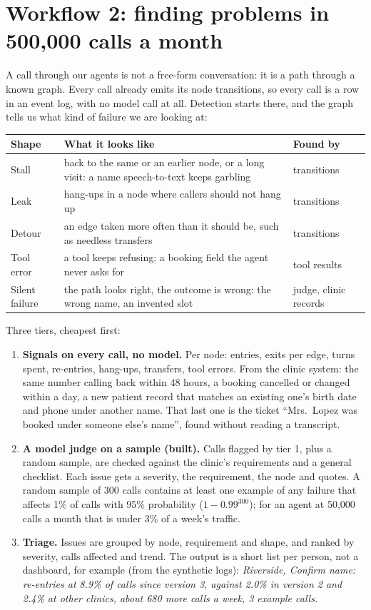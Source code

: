 \documentclass[11pt,a4paper]{article}
\begin{document}
\section{Workflow 2: finding problems in 500,000 calls a month}

A call through our agents is not a free-form conversation: it is a path through a known graph. Every call already emits its node transitions, so every call is a row in an event log, with no model call at all. Detection starts there, and the graph tells us what kind of failure we are looking at:

\begin{center}\small
\begin{tabularx}{\linewidth}{@{}l X l@{}}
\toprule
\textbf{Shape} & \textbf{What it looks like} & \textbf{Found by} \\
\midrule
Stall & back to the same or an earlier node, or a long visit: a name speech-to-text keeps garbling & transitions \\
Leak & hang-ups in a node where callers should not hang up & transitions \\
Detour & an edge taken more often than it should be, such as needless transfers & transitions \\
Tool error & a tool keeps refusing: a booking field the agent never asks for & tool results \\
Silent failure & the path looks right, the outcome is wrong: the wrong name, an invented slot & judge, clinic records \\
\bottomrule
\end{tabularx}
\end{center}

Three tiers, cheapest first:
\begin{enumerate}[leftmargin=1.4em]
  \item \textbf{Signals on every call, no model.} Per node: entries, exits per edge, turns spent, re-entries, hang-ups, transfers, tool errors. From the clinic system: the same number calling back within 48 hours, a booking cancelled or changed within a day, a new patient record that matches an existing one's birth date and phone under another name. That last one is the ticket ``Mrs.\ Lopez was booked under someone else's name'', found without reading a transcript.
  \item \textbf{A model judge on a sample (built).} Calls flagged by tier 1, plus a random sample, are checked against the clinic's requirements and a general checklist. Each issue gets a severity, the requirement, the node and quotes. A random sample of 300 calls contains at least one example of any failure that affects 1\% of calls with 95\% probability ($1-0.99^{300}$); for an agent at 50,000 calls a month that is under 3\% of a week's traffic.
  \item \textbf{Triage.} Issues are grouped by node, requirement and shape, and ranked by severity, calls affected and trend. The output is a short list per person, not a dashboard, for example (from the synthetic logs): \emph{Riverside, Confirm name: re-entries at 8.9\% of calls since version 3, against 2.0\% in version 2 and 2.4\% at other clinics, about 680 more calls a week, 3 example calls.}
\end{enumerate}
\end{document}

